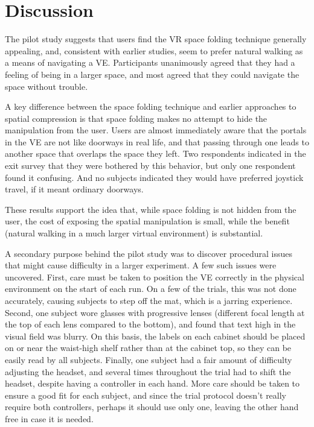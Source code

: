 \documentclass{sigchi}
\begin{document}
\section{Discussion}

The pilot study suggests that users find the VR space folding technique generally appealing, and, consistent with earlier studies, seem to prefer natural walking as a means of navigating a VE.  Participants unanimously agreed that they had a feeling of being in a larger space, and most agreed that they could navigate the space without trouble.

A key difference between the space folding technique and earlier approaches to spatial compression is that space folding makes no attempt to hide the manipulation from the user.  Users are almost immediately aware that the portals in the VE are not like doorways in real life, and that passing through one leads to another space that overlaps the space they left.  Two respondents indicated in the exit survey that they were bothered by this behavior, but only one respondent found it confusing.  And no subjects indicated they would have preferred joystick travel, if it meant ordinary doorways.

These results support the idea that, while space folding is not hidden from the user, the cost of exposing the spatial manipulation is small, while the benefit (natural walking in a much larger virtual environment) is substantial.

A secondary purpose behind the pilot study was to discover procedural issues that might cause difficulty in a larger experiment.  A few such issues were uncovered.  First, care must be taken to position the VE correctly in the physical environment on the start of each run.  On a few of the trials, this was not done accurately, causing subjects to step off the mat, which is a jarring experience.  Second, one subject wore glasses with progressive lenses (different focal length at the top of each lens compared to the bottom), and found that text high in the visual field was blurry.  On this basis, the labels on each cabinet should be placed on or near the waist-high shelf rather than at the cabinet top, so they can be easily read by all subjects.  Finally, one subject had a fair amount of difficulty adjusting the headset, and several times throughout the trial had to shift the headset, despite having a controller in each hand.  More care should be taken to ensure a good fit for each subject, and since the trial protocol doesn’t really require both controllers, perhaps it should use only one, leaving the other hand free in case it is needed.
\end{document}
